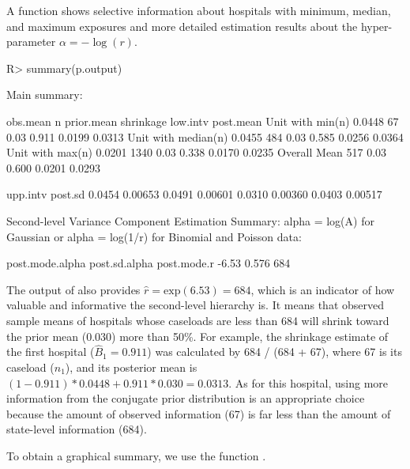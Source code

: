 \documentclass[article]{jss}
\begin{document}
A function  shows selective information about hospitals with minimum, median, and maximum exposures and more detailed estimation results about the hyper-parameter $\alpha=-\log(r)$.  \begin{CodeChunk}
\begin{CodeInput}
R> summary(p.output)
\end{CodeInput}
\begin{CodeOutput}
Main summary:

                    obs.mean    n prior.mean shrinkage low.intv post.mean
Unit with min(n)      0.0448   67       0.03     0.911   0.0199    0.0313   
Unit with median(n)   0.0455  484       0.03     0.585   0.0256    0.0364   
Unit with max(n)      0.0201 1340       0.03     0.338   0.0170    0.0235   
Overall Mean                  517       0.03     0.600   0.0201    0.0293   

                    upp.intv  post.sd
                      0.0454  0.00653
                      0.0491  0.00601
                      0.0310  0.00360
                      0.0403  0.00517

Second-level Variance Component Estimation Summary:
alpha = log(A) for Gaussian or alpha = log(1/r) for Binomial and Poisson data:

post.mode.alpha post.sd.alpha post.mode.r
          -6.53         0.576         684
\end{CodeOutput}
\end{CodeChunk}
The output of  also provides $\hat{r}=\textrm{exp}(6.53)=684$, which is an indicator of how valuable and informative the second-level hierarchy is. It means that observed sample means of hospitals whose caseloads are less than 684 will shrink toward the prior mean (0.030) more than 50\%. For example, the shrinkage estimate of the first hospital ($\hat{B}_{1}= 0.911$) was calculated by 684 / (684 + 67), where 67 is its caseload ($n_{1}$), and its posterior mean is $(1-0.911)*0.0448 + 0.911 * 0.030=0.0313$. As for this hospital, using more information from the conjugate prior distribution is an appropriate choice because the amount  of observed information (67) is far less than the amount of state-level information (684).


To obtain a graphical summary, we use the function .%
\end{document}
